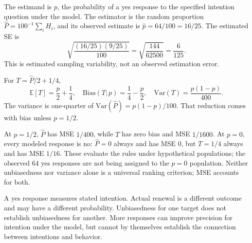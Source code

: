\documentclass[11pt]{article}
\begin{document}
\begin{parts}
\item The estimand is $p$, the probability of a yes response to the specified intention question under the model. The estimator is the random proportion $\widehat P=100^{-1}\sum_i H_i$, and its observed estimate is $\widehat p=64/100=16/25$. The estimated SE is
\[
\sqrt{\frac{(16/25)(9/25)}{100}}=\sqrt{\frac{144}{62500}}=\frac6{125}.
\]
This is estimated sampling variability, not an observed estimation error.
\item For $T=\widehat P/2+1/4$,
\[
\mathbb E[T]=\frac p2+\frac14,\quad
\mathrm{Bias}(T;p)=\frac14-\frac p2,\quad
\mathrm{Var}(T)=\frac{p(1-p)}{400}.
\]
The variance is one-quarter of $\mathrm{Var}(\widehat P)=p(1-p)/100$. That reduction comes with bias unless $p=1/2$.
\item At $p=1/2$, $\widehat P$ has MSE $1/400$, while $T$ has zero bias and MSE $1/1600$. At $p=0$, every modeled response is no: $\widehat P=0$ always and has MSE 0, but $T=1/4$ always and has MSE $1/16$. These evaluate the rules under hypothetical populations; the observed 64 yes responses are not being assigned to the $p=0$ population. Neither unbiasedness nor variance alone is a universal ranking criterion; MSE accounts for both.
\item A yes response measures stated intention. Actual renewal is a different outcome and may have a different probability. Unbiasedness for one target does not establish unbiasedness for another. More responses can improve precision for intention under the model, but cannot by themselves establish the connection between intentions and behavior.
\end{parts}
\end{document}
